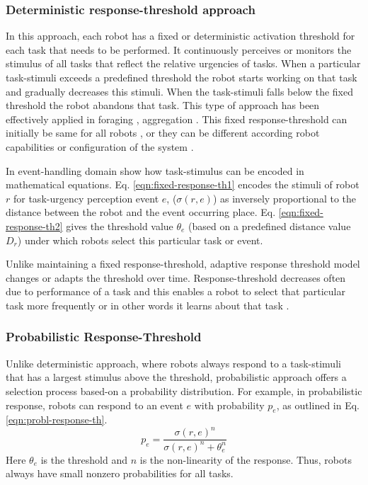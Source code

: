 \subsubsection*{Deterministic response-threshold approach}
In this approach, each robot has a fixed or deterministic activation threshold for each task that needs to be performed. It continuously perceives or monitors the stimulus of all tasks that reflect the relative urgencies of tasks. When a particular task-stimuli exceeds a predefined  threshold the robot starts working on that task and gradually decreases this stimuli. When the task-stimuli falls below the fixed threshold the robot abandons that task. This type of approach has been effectively applied in foraging \cite{Krieger+2000,Liu+2007}, aggregation \cite{Agassounon+2002}. This fixed response-threshold can initially be same for all robots \cite{Jones+200}, or they can be different according robot capabilities or configuration of the system \cite{Krieger+2000}.

In event-handling domain  show how task-stimulus can be encoded in mathematical equations. Eq. \ref{eqn:fixed-response-th1} encodes the stimuli of robot $r$ for task-urgency perception event $e$, ($\sigma (r,e)$)  as inversely proportional to the distance between the robot and the event occurring place. Eq. \ref{eqn:fixed-response-th2} gives the threshold value $\theta_{e}$ (based on a predefined distance value $D_{r}$) under which robots select this particular task or event. 

Unlike maintaining a fixed response-threshold, adaptive response threshold model changes or adapts the threshold over time. Response-threshold decreases often due to performance of a task and this enables a robot  to select that particular task more frequently or in other words it learns about that task \cite{Bonabeau+1999,Agassounon+2002}.
\subsubsection*{Probabilistic Response-Threshold}
Unlike deterministic approach, where robots always respond to a task-stimuli that has a largest stimulus above the threshold,  probabilistic approach offers a selection process based-on a probability distribution. For example, in probabilistic response, robots can respond to an event $e$ with probability $p_{e}$, as outlined in Eq. \ref{eqn:probl-response-th}.
\begin{equation}
\label{eqn:probl-response-th}
p_{e} = \frac{\sigma (r,e)^n}{\sigma (r,e)^n + \theta_{e}^n}
\end{equation}
Here $\theta_{e}$ is the threshold and $n$ is the non-linearity of the response. Thus, robots  always have small nonzero probabilities  for all tasks.


